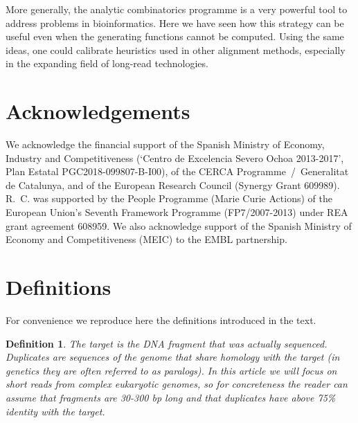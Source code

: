 \documentclass{article}
\newtheorem{definition}{Definition}
\begin{document}
More generally, the analytic combinatorics programme is a very powerful
tool to address problems in bioinformatics. Here we have seen how this
strategy can be useful even when the generating functions cannot be
computed. Using the same ideas, one could calibrate heuristics used in
other alignment methods, especially in the expanding field of long-read
technologies.


\section*{Acknowledgements}

We acknowledge the financial support of the Spanish Ministry of Economy,
Industry and Competitiveness (`Centro de Excelencia Severo Ochoa
2013-2017', Plan Estatal PGC2018-099807-B-I00), of the CERCA
Programme~/~Generalitat de Catalunya, and of the European Research Council
(Synergy Grant 609989). R.~C. was supported by the People Programme
(Marie Curie Actions) of the European Union's Seventh Framework Programme
(FP7/2007-2013) under REA grant agreement 608959. We also acknowledge
support of the Spanish Ministry of Economy and Competitiveness (MEIC) to
the EMBL partnership.






\appendix

\section{Definitions}
\label{app_def}
\setcounter{definition}{0}

For convenience we reproduce here the definitions introduced in the text.

\begin{definition}
The target is the DNA fragment that was actually sequenced. Duplicates are
sequences of the genome that share homology with the target (in genetics
they are often referred to as paralogs). In this article we will focus on
short reads from complex eukaryotic genomes, so for concreteness the
reader can assume that fragments are 30-300 bp long and that duplicates
have above 75\% identity with the target.
\end{definition}
\end{document}
